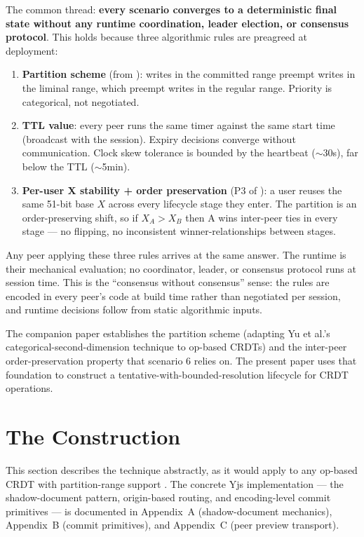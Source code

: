 The common thread: \textbf{every scenario converges to a deterministic final state without any runtime coordination, leader election, or consensus protocol}. This holds because three algorithmic rules are preagreed at deployment:

\begin{enumerate}
    \item \textbf{Partition scheme} (from \cite{plexus:partitioning}): writes in the committed range preempt writes in the liminal range, which preempt writes in the regular range. Priority is categorical, not negotiated.
    \item \textbf{TTL value}: every peer runs the same timer against the same start time (broadcast with the session). Expiry decisions converge without communication. Clock skew tolerance is bounded by the heartbeat ($\sim$30s), far below the TTL ($\sim$5min).
    \item \textbf{Per-user X stability + order preservation} (P3 of \cite{plexus:partitioning}): a user reuses the same 51-bit base $X$ across every lifecycle stage they enter. The partition is an order-preserving shift, so if $X_A > X_B$ then A wins inter-peer ties in every stage --- no flipping, no inconsistent winner-relationships between stages.
\end{enumerate}

Any peer applying these three rules arrives at the same answer. The runtime is their mechanical evaluation; no coordinator, leader, or consensus protocol runs at session time. This is the ``consensus without consensus'' sense: the rules are encoded in every peer's code at build time rather than negotiated per session, and runtime decisions follow from static algorithmic inputs.

The companion paper \cite{plexus:partitioning} establishes the partition scheme (adapting Yu et al.'s categorical-second-dimension technique to op-based CRDTs) and the inter-peer order-preservation property that scenario 6 relies on. The present paper uses that foundation to construct a tentative-with-bounded-resolution lifecycle for CRDT operations.

\section{The Construction}

This section describes the technique abstractly, as it would apply to any op-based CRDT with partition-range support \cite{plexus:partitioning}. The concrete Yjs implementation --- the shadow-document pattern, origin-based routing, and encoding-level commit primitives --- is documented in Appendix~A (shadow-document mechanics), Appendix~B (commit primitives), and Appendix~C (peer preview transport).

